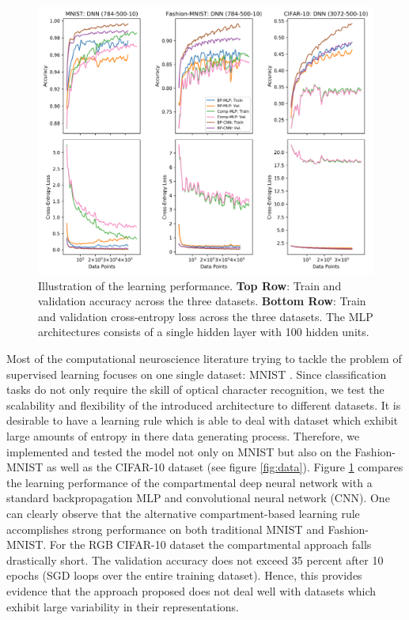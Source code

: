 \documentclass[colorinlistoftodos]{article}
\theoremstyle{definition}
\begin{document}
\begin{figure}[H]
	\centering
	\includegraphics[width=\textwidth]{../figures/learning}
	\caption{Illustration of the learning performance. \textbf{Top Row}: Train and validation accuracy across the three datasets. \textbf{Bottom Row}: Train and validation cross-entropy loss across the three datasets. The MLP architectures consists of a single hidden layer with 100 hidden units.} \label{fig:performance}
\end{figure}

Most of the computational neuroscience literature trying to tackle the problem of supervised learning focuses on one single dataset: MNIST \cite{lecun_1998}. Since classification tasks do not only require the skill of optical character recognition, we test the scalability and flexibility of the introduced architecture to different datasets. It is desirable to have a learning rule which is able to deal with dataset which exhibit large amounts of entropy in there data generating process. Therefore, we implemented and tested the \citet{guerguiev2017} model not only on MNIST but also on the Fashion-MNIST \citep{xiao_2017} as well as the CIFAR-10 \citep{torralba_2008} dataset (see figure \ref{fig:data}). Figure \ref{fig:performance} compares the learning performance of the compartmental deep neural network with a standard backpropagation MLP and convolutional neural network (CNN). One can clearly observe that the alternative compartment-based learning rule accomplishes strong performance on both traditional MNIST and Fashion-MNIST. For the RGB CIFAR-10 dataset the compartmental approach falls drastically short. The validation accuracy does not exceed 35 percent after 10 epochs (SGD loops over the entire training dataset).
Hence, this provides evidence that the approach proposed does not deal well with datasets which exhibit large variability in their representations.
\end{document}
